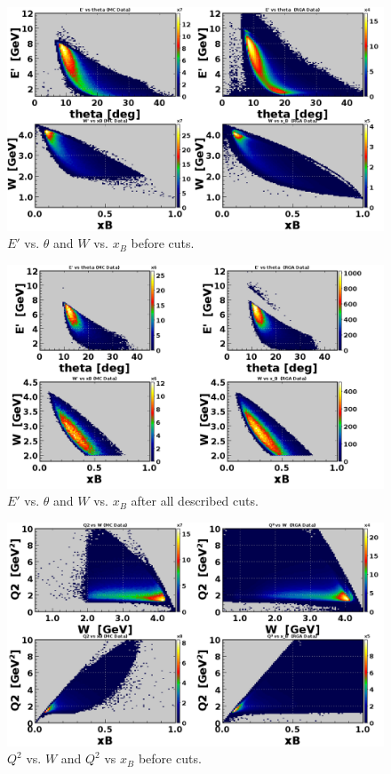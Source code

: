 \newpage
\begin{figure}[h!]
	\centering
	\includegraphics[width=0.9\linewidth]{figures/rga/uncut/2Dkin1.png}
	\caption{$E'$ vs. $\theta$ and $W$ vs. $x_B$ before cuts.}
	\label{fig:rga_2Dkin1_uncut}
\end{figure}

\begin{figure}[h!]
	\centering
	\includegraphics[width=0.9\linewidth]{figures/rga/2Dkin1.png}
	\caption{$E'$ vs. $\theta$ and $W$ vs. $x_B$ after all described cuts.}
	\label{fig:rga_2Dkin1}
\end{figure}

\newpage
\begin{figure}[h!]
	\centering
	\includegraphics[width=0.9\linewidth]{figures/rga/uncut/2Dkin2.png}
	\caption{$Q^2$ vs. $W$ and $Q^2$ vs $x_B$ before cuts.}
	\label{fig:rga_2Dkin2_uncut}
\end{figure}

